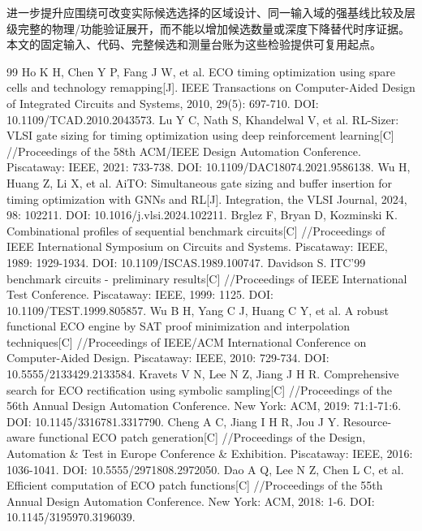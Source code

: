 \documentclass[twocolumn,10pt,fontset=windows]{ctexart}
\begin{document}
进一步提升应围绕可改变实际候选选择的区域设计、同一输入域的强基线比较及层级完整的物理/功能验证展开，而不能以增加候选数量或深度下降替代时序证据。本文的固定输入、代码、完整候选和测量台账为这些检验提供可复用起点。

\renewcommand{\refname}{参考文献}
\footnotesize
\linespread{0.95}\selectfont
\begin{thebibliography}{99}
 Ho K H, Chen Y P, Fang J W, et al. ECO timing optimization using spare cells and technology remapping[J]. IEEE Transactions on Computer-Aided Design of Integrated Circuits and Systems, 2010, 29(5): 697-710. DOI: 10.1109/TCAD.2010.2043573.
 Lu Y C, Nath S, Khandelwal V, et al. RL-Sizer: VLSI gate sizing for timing optimization using deep reinforcement learning[C] //Proceedings of the 58th ACM/IEEE Design Automation Conference. Piscataway: IEEE, 2021: 733-738. DOI: 10.1109/DAC18074.2021.9586138.
 Wu H, Huang Z, Li X, et al. AiTO: Simultaneous gate sizing and buffer insertion for timing optimization with GNNs and RL[J]. Integration, the VLSI Journal, 2024, 98: 102211. DOI: 10.1016/j.vlsi.2024.102211.
 Brglez F, Bryan D, Kozminski K. Combinational profiles of sequential benchmark circuits[C] //Proceedings of IEEE International Symposium on Circuits and Systems. Piscataway: IEEE, 1989: 1929-1934. DOI: 10.1109/ISCAS.1989.100747.
 Davidson S. ITC'99 benchmark circuits - preliminary results[C] //Proceedings of IEEE International Test Conference. Piscataway: IEEE, 1999: 1125. DOI: 10.1109/TEST.1999.805857.
 Wu B H, Yang C J, Huang C Y, et al. A robust functional ECO engine by SAT proof minimization and interpolation techniques[C] //Proceedings of IEEE/ACM International Conference on Computer-Aided Design. Piscataway: IEEE, 2010: 729-734. DOI: 10.5555/2133429.2133584.
 Kravets V N, Lee N Z, Jiang J H R. Comprehensive search for ECO rectification using symbolic sampling[C] //Proceedings of the 56th Annual Design Automation Conference. New York: ACM, 2019: 71:1-71:6. DOI: 10.1145/3316781.3317790.
 Cheng A C, Jiang I H R, Jou J Y. Resource-aware functional ECO patch generation[C] //Proceedings of the Design, Automation \& Test in Europe Conference \& Exhibition. Piscataway: IEEE, 2016: 1036-1041. DOI: 10.5555/2971808.2972050.
 Dao A Q, Lee N Z, Chen L C, et al. Efficient computation of ECO patch functions[C] //Proceedings of the 55th Annual Design Automation Conference. New York: ACM, 2018: 1-6. DOI: 10.1145/3195970.3196039.

\end{thebibliography}
\end{document}
